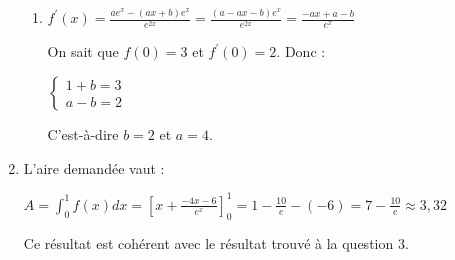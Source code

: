 \begin{corrige}
\begin{enumerate}
          \begin{enumerate}
               \item
               $f^{\prime}\left(x\right)=\frac{ae^{x}-\left(ax+b\right)e^{x}}{e^{2x}}=\frac{\left(a-ax-b\right)e^{x}}{e^{2x}}=\frac{-ax+a-b}{e^{x}}$
               \par
               On sait que $f\left(0\right)=3$ et $f^{\prime}\left(0\right)=2$. Donc :
               \par
               $\left\{ \begin{matrix} 1+b=3 \\ a-b=2 \end{matrix}\right.$
                    \par
                    C'est-à-dire $b=2$ et $a=4$.
          \end{enumerate}      
               \item
               L'aire demandée vaut :
               \par
               $A=\int_{0}^{1}f\left(x\right)dx=\left[x+\frac{-4x-6}{e^{x}}\right]_{0}^{1}=1-\frac{10}{e}-\left(-6\right)=7-\frac{10}{e}\approx 3,32$
               \par
               Ce résultat est cohérent avec le résultat trouvé à la question 3.
    
\end{enumerate}
     \end{corrige}
